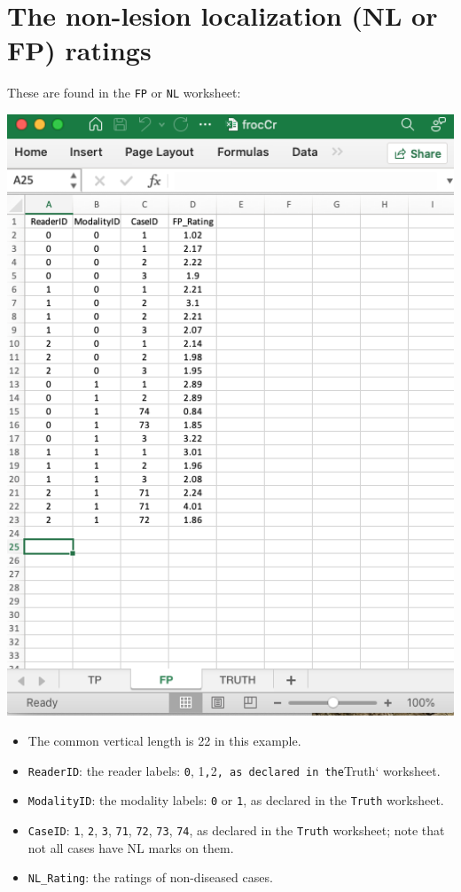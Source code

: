 \documentclass[
]{book}
\providecommand{\tightlist}{%
  \setlength{\itemsep}{0pt}\setlength{\parskip}{0pt}}
\begin{document}
\hypertarget{the-non-lesion-localization-nl-or-fp-ratings}{%
\section{The non-lesion localization (NL or FP) ratings}\label{the-non-lesion-localization-nl-or-fp-ratings}}

These are found in the \texttt{FP} or \texttt{NL} worksheet:

\includegraphics[width=1\textwidth,height=\textheight]{images/software-details/frocCrFp.png}

\begin{itemize}
\tightlist
\item
  The common vertical length is 22 in this example.
\item
  \texttt{ReaderID}: the reader labels: \texttt{0}, 1\texttt{,}2\texttt{,\ as\ declared\ in\ the}Truth` worksheet.
\item
  \texttt{ModalityID}: the modality labels: \texttt{0} or \texttt{1}, as declared in the \texttt{Truth} worksheet.
\item
  \texttt{CaseID}: \texttt{1}, \texttt{2}, \texttt{3}, \texttt{71}, \texttt{72}, \texttt{73}, \texttt{74}, as declared in the \texttt{Truth} worksheet; note that not all cases have NL marks on them.\\
\item
  \texttt{NL\_Rating}: the ratings of non-diseased cases.
\end{itemize}
\end{document}
